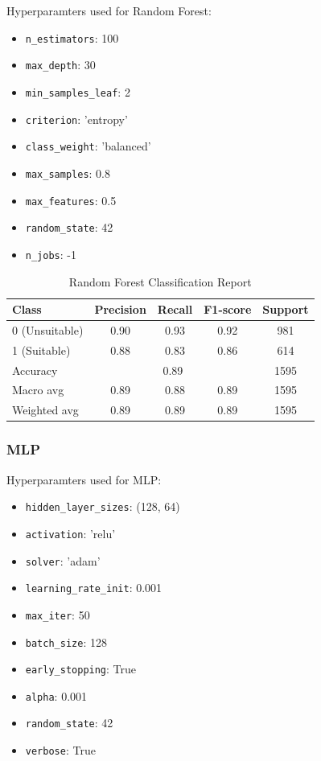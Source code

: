 \documentclass[12pt,a4paper]{article}
\begin{document}
  Hyperparamters used for Random Forest:
  \begin{itemize}
    \item \texttt{n\_estimators}: 100
    \item \texttt{max\_depth}: 30
    \item \texttt{min\_samples\_leaf}: 2
    \item \texttt{criterion}: 'entropy'
    \item \texttt{class\_weight}: 'balanced'
    \item \texttt{max\_samples}: 0.8
    \item \texttt{max\_features}: 0.5
    \item \texttt{random\_state}: 42
    \item \texttt{n\_jobs}: -1
  \end{itemize}

\begin{table}[H]
  \centering
  \caption{Random Forest Classification Report}
  \begin{tabular}{lcccc}
    \toprule
    Class & Precision & Recall & F1-score & Support \\
    \midrule
    0 (Unsuitable) & 0.90 & 0.93 & 0.92 & 981 \\
    1 (Suitable)   & 0.88 & 0.83 & 0.86 & 614 \\
    \midrule
    Accuracy       & \multicolumn{3}{c}{0.89} & 1595 \\
    Macro avg      & 0.89 & 0.88 & 0.89 & 1595 \\
    Weighted avg   & 0.89 & 0.89 & 0.89 & 1595 \\
    \bottomrule
  \end{tabular}
\end{table}

\subsubsection{MLP}

Hyperparamters used for MLP:
  \begin{itemize}
    \item \texttt{hidden\_layer\_sizes}: (128, 64)
    \item \texttt{activation}: 'relu'
    \item \texttt{solver}: 'adam'
    \item \texttt{learning\_rate\_init}: 0.001
    \item \texttt{max\_iter}: 50
    \item \texttt{batch\_size}: 128
    \item \texttt{early\_stopping}: True
    \item \texttt{alpha}: 0.001
    \item \texttt{random\_state}: 42
    \item \texttt{verbose}: True
  \end{itemize}
\end{document}

